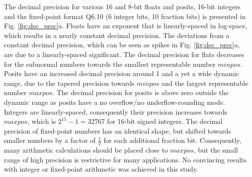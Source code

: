 \documentclass[draft]{agujournal2019}
\begin{document}
The decimal precision for various 16 and 8-bit floats and posits, 16-bit integers
and the fixed-point format Q6.10 (6 integer bits, 10 fraction bits) is presented
in Fig. \ref{fig:dec_prec}a. Floats have an exponent that is linearly-spaced in
log-space, which results in a nearly constant decimal precision. The deviations
from a constant decimal precision, which can be seen as spikes in Fig. \ref{fig:dec_prec}a,
are due to a linearly-spaced significant. The decimal precision for flats decreases
for the subnormal numbers towards the smallest representable number $minpos$.
Posits have an increased decimal precision around 1 and a yet a wide dynamic range,
due to the tapered precision towards $minpos$ and the largest representable number
$maxpos$. The decimal precision for posits is above zero outside the dynamic range as posits
have a no overflow/no underflow-rounding mode. Integers are linearly-spaced,
consequently their precision increases towards $maxpos$,
which is $2^{15} - 1 =  32767$ for 16-bit signed integers. The decimal precision of
fixed-point numbers has an identical shape, but shifted towards smaller numbers
by a factor of $\tfrac{1}{2}$ for each additional fraction bit. Consequently,
many arithmetic calculations should be placed close to $maxpos$, but the small
range of high precision is restrictive for many applications. No convincing results
with integer or fixed-point arithmetic was achieved in this study.
\end{document}

